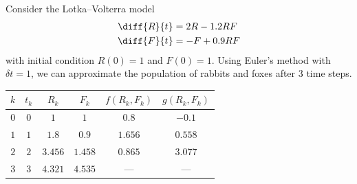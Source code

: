 \documentclass[10pt]{mypackage}
\begin{document}
\begin{example}
  Consider the Lotka--Volterra model
  \begin{align*}
    \diff{R}{t} &= 2R - 1.2RF\\
    \diff{F}{t} &= -F + 0.9RF
  \end{align*}
  with initial condition $R(0) = 1$ and $F(0) = 1$. Using Euler's method with $\delta t = 1$, we can approximate the population of rabbits and foxes after 3 time steps.
  \begin{center}
    \begin{tabular}{c|c|c|c|c|c}
      $k$ & $t_k$ &$ R_k$ & $F_k$ & $f\left(R_k,F_k\right)$ & $g\left(R_k,F_k\right)$\\
      \hline
      $0$ & $0$ & $1$ & $1$ & $0.8$ & $-0.1$\\
      $1$ & $1$ & $1.8$ & $0.9$ & $1.656$ & $0.558$\\
      $2$ & $2$ & $3.456$ & $1.458$ & $0.865$ & $3.077$\\
      $3$ & $3$ & $4.321$ & $4.535$ & --- & ---
    \end{tabular}
  \end{center}
\end{example}
\end{document}
